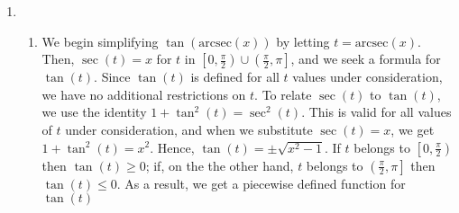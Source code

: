 \begin{ex}
\begin{enumerate}
\begin{enumerate}
\item  Once again, Theorem \ref{arcsecantcosecantfunctionprops1} comes to our aid giving $\mbox{arccsc}(-2) = \arcsin\left(-\frac{1}{2}\right) = -\frac{\pi}{6}$.


\item  Since $\frac{5\pi}{4}$ doesn't fall between $0$ and $\frac{\pi}{2}$ or $\frac{\pi}{2}$ and $\pi$, we cannot use the inverse property stated in Theorem \ref{arcsecantcosecantfunctionprops1}.  We can, nevertheless, begin by working `inside out' which yields  $\mbox{arcsec}\left( \sec\left( \frac{5\pi}{4} \right) \right) = \mbox{arcsec}(-\sqrt{2}) = \arccos\left(-\frac{\sqrt{2}}{2}\right) = \frac{3\pi}{4}$.

\item   One way to begin to simplify $\cot\left(\mbox{arccsc}\left(-3\right)\right)$ is to let $t = \mbox{arccsc}(-3)$.  Then,  $\csc(t) = -3$ and, since this is negative, we have that $t$ lies in the interval  $\left[ -\frac{\pi}{2},0\right)$.  We are after $\cot\left(\mbox{arccsc}\left(-3\right)\right) = \cot(t)$, so we use the Pythagorean Identity $1 + \cot^{2}(t) = \csc^{2}(t)$.  Substituting, we have $1 + \cot^{2}(t) = (-3)^2$, or $\cot(t) = \pm \sqrt{8} = \pm 2 \sqrt{2}$.  Since $-\frac{\pi}{2} \leq t < 0$, $\cot(t) < 0$, so we get  $\cot\left(\mbox{arccsc}\left(-3\right)\right) = -2\sqrt{2}$.

\end{enumerate}

\item 

\begin{enumerate}


\item  We begin simplifying  $\tan(\mbox{arcsec}(x))$ by letting $t = \mbox{arcsec}(x)$.  Then, $\sec(t) = x$ for $t$ in $\left[0, \frac{\pi}{2}\right) \cup \left(\frac{\pi}{2}, \pi \right]$, and we seek a formula for $\tan(t)$.  Since $\tan(t)$ is defined for all $t$ values under consideration, we have no additional restrictions on $t$.  To relate $\sec(t)$ to $\tan(t)$, we use the identity $1 + \tan^{2}(t) = \sec^{2}(t)$.  This is valid for all values of $t$ under consideration, and when we substitute $\sec(t) = x$, we get $1 + \tan^{2}(t) = x^2$.  Hence, $\tan(t) = \pm \sqrt{x^2-1}$.  If $t$ belongs to $\left[0, \frac{\pi}{2}\right)$ then $\tan(t) \geq 0$;  if, on the the other hand, $t$ belongs to  $\left(\frac{\pi}{2}, \pi \right]$ then $\tan(t) \leq 0$. As a result, we get a piecewise defined function for $\tan(t)$


\end{enumerate}
\end{enumerate}
\end{ex}
